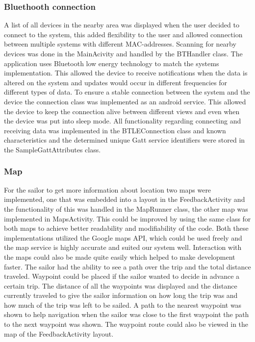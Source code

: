 \subsubsection{Bluethooth connection}
A list of all devices in the nearby area was displayed when the user decided to connect to the system, this added flexibility to the user and allowed connection between multiple systems with different MAC-addresses. Scanning for nearby devices was done in the MainAcivity and handled by the BTHandler class. The application uses Bluetooth low energy technology to match the systems implementation. This allowed the device to receive notifications when the data is altered on the system and updates would occur in different frequencies for different types of data. To ensure a stable connection between the system and the device the connection class was implemented as an android service\cite{android-service}. This allowed the device to keep the connection alive between different views and even when the device was put into sleep mode. All functionality regarding connecting and receiving data was implemented in the BTLEConnection class and known characteristics and the determined unique Gatt service identifiers were stored in the SampleGattAttributes class.

\subsubsection{Map}
For the sailor to get more information about location two maps were implemented, one that was embedded into a layout in the FeedbackActivity and the functionality of this was handled in the MapRunner class, the other map was implemented in MapsActivity. This could be improved by using the same class for both maps to achieve better readability and modifiability of the code. Both these implementations utilized the Google maps API\cite{gmaps}, which could be used freely and the map service is highly accurate and suited our system well. Interaction with the maps could also be made quite easily which helped to make development faster. The sailor had the ability to see a path over the trip and the total distance traveled. Waypoint could be placed if the sailor wanted to decide in advance a certain trip. The distance of all the waypoints was displayed and the distance currently traveled to give the sailor information on how long the trip was and how much of the trip was left to be sailed. A path to the nearest waypoint was shown to help navigation when the sailor was close to the first waypoint the path to the next waypoint was shown. The waypoint route could also be viewed in the map of the FeedbackActivity layout.

